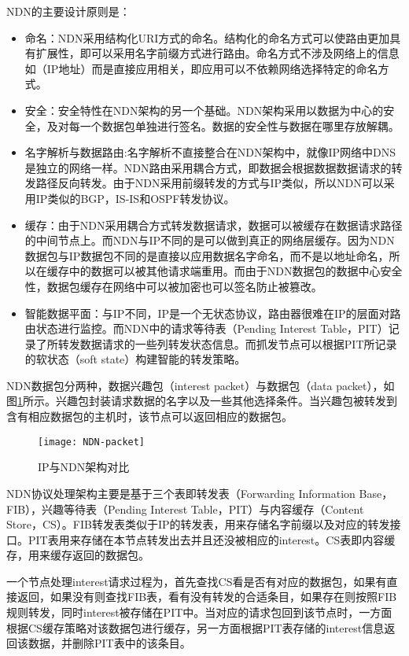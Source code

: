 NDN的主要设计原则是：
\begin{itemize}
\item 命名：NDN采用结构化URI方式的命名。结构化的命名方式可以使路由更加具有扩展性，即可以采用名字前缀方式进行路由。命名方式不涉及网络上的信息如（IP地址）而是直接应用相关，即应用可以不依赖网络选择特定的命名方式。
\item 安全：安全特性在NDN架构的另一个基础。NDN架构采用以数据为中心的安全，及对每一个数据包单独进行签名。数据的安全性与数据在哪里存放解耦。
\item 名字解析与数据路由:名字解析不直接整合在NDN架构中，就像IP网络中DNS是独立的网络一样。NDN路由采用耦合方式，即数据会根据数据数据请求的转发路径反向转发。由于NDN采用前缀转发的方式与IP类似，所以NDN可以采用IP类似的BGP，IS-IS和OSPF转发协议。
\item 缓存：由于NDN采用耦合方式转发数据请求，数据可以被缓存在数据请求路径的中间节点上。而NDN与IP不同的是可以做到真正的网络层缓存。因为NDN数据包与IP数据包不同的是直接以应用数据名字命名，而不是以地址命名，所以在缓存中的数据可以被其他请求端重用。而由于NDN数据包的数据中心安全性，数据包缓存在网络中可以被加密也可以签名防止被篡改。
\item 智能数据平面：与IP不同，IP是一个无状态协议，路由器很难在IP的层面对路由状态进行监控。而NDN中的请求等待表（Pending Interest Table，PIT）记录了所转发数据请求的一些列转发状态信息。而抓发节点可以根据PIT所记录的软状态（soft state）构建智能的转发策略。
\end{itemize}

NDN数据包分两种，数据兴趣包（interest packet）与数据包（data packet），如图\ref{fig:NDN-packet}所示。兴趣包封装请求数据的名字以及一些其他选择条件。当兴趣包被转发到含有相应数据包的主机时，该节点可以返回相应的数据包。
\begin{figure}[H]
  \centering
  \texttt{[image: NDN-packet]}
  \caption{IP与NDN架构对比}
  \label{fig:NDN-packet}
\end{figure}

NDN协议处理架构主要是基于三个表即转发表（Forwarding Information Base，FIB），兴趣等待表（Pending Interest Table，PIT）与内容缓存（Content Store，CS）。FIB转发表类似于IP的转发表，用来存储名字前缀以及对应的转发接口。PIT表用来存储在本节点转发出去并且还没被相应的interest。CS表即内容缓存，用来缓存返回的数据包。

一个节点处理interest请求过程为，首先查找CS看是否有对应的数据包，如果有直接返回，如果没有则查找FIB表，看有没有转发的合适条目，如果存在则按照FIB规则转发，同时interest被存储在PIT中。当对应的请求包回到该节点时，一方面根据CS缓存策略对该数据包进行缓存，另一方面根据PIT表存储的interest信息返回该数据，并删除PIT表中的该条目。

